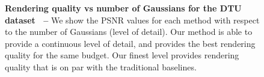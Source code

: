 
\begin{figure}[t]
  \centering
  \resizebox{0.8\linewidth}{!}{
    
  }
  \caption{\textbf{Rendering quality vs number of Gaussians for the DTU dataset~\cite{aanaes2016large} --}
    We show the PSNR values for each method with respect to the number of
    Gaussians (level of detail).
    Our method is able to provide a continuous level of detail, and provides
    the best rendering quality for the same budget.
    Our finest level provides rendering quality that is on par with the
    traditional baselines.
  }
  \label{fig:clog-num-gaussians-psnr}
\end{figure}